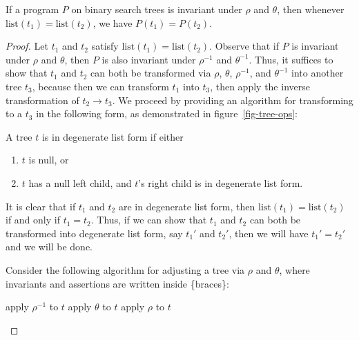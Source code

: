 \documentclass{llncs}
\begin{document}
  \begin{theorem}
    If a program $P$ on binary search trees is invariant under $\rho$
    and $\theta$, then whenever $\mathrm{list}(t_1) = \mathrm{list}(t_2)$,
    we have $P(t_1) = P(t_2)$.
  \end{theorem}
  \begin{proof}
    Let $t_1$ and $t_2$ satisfy $\mathrm{list}(t_1) = \mathrm{list}(t_2)$.
    Observe that if $P$ is invariant under $\rho$ and $\theta$,
    then $P$ is also invariant under $\rho^{-1}$ and $\theta^{-1}$.
    Thus, it suffices to show that $t_1$ and $t_2$ can both be transformed
    via $\rho$, $\theta$, $\rho^{-1}$, and $\theta^{-1}$ into another tree $t_3$,
    because then we can transform $t_1$ into $t_3$, then apply the inverse
    transformation of $t_2 \rightarrow t_3$.
    We proceed by providing an algorithm for transforming to a $t_3$
    in the following form, as demonstrated in
    figure~\ref{fig-tree-ops}:

    \begin{definition}
      A tree $t$ is in degenerate list form if either
      \begin{enumerate}
        \item $t$ is null, or
        \item $t$ has a null left child, and $t$'s right child is in degenerate
          list form.
      \end{enumerate}
    \end{definition}

    It is clear that if $t_1$ and $t_2$ are in degenerate list form, then
    $\mathrm{list}(t_1) = \mathrm{list}(t_2)$ if and only if $t_1 = t_2$.
    Thus, if we can show that $t_1$ and $t_2$ can both be transformed into
    degenerate list form, say $t_1'$ and $t_2'$, then we will have $t_1' = t_2'$
    and we will be done.

    Consider the following algorithm for adjusting a tree via $\rho$ and $\theta$,
    where invariants and assertions are written inside \{braces\}:

    \vspace{-0.2in}
    \begin{algorithm}
      \begin{algorithmic}[1]
            \State apply $\rho^{-1}$ to $t$
          \EndWhile
           \label{null-right}
            \label{inner-loop}
              \State apply $\theta$ to $t$
            \EndWhile
              \label{null-left-right}
            \State apply $\rho$ to $t$ \label{apply-rho}
          \EndWhile
           \label{postcond}
        \EndFunction
      \end{algorithmic}
    \end{algorithm} 
    \vspace{-0.1in}


\end{proof}
\end{document}
